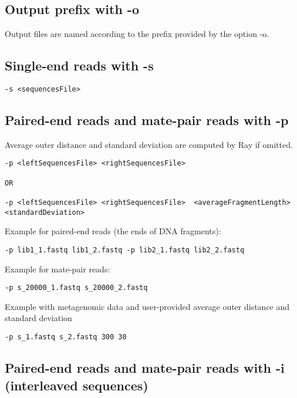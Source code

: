 \documentclass{article}
\begin{document}
\subsection{Output prefix with -o}

Output files are named according to the prefix provided by the option -o.

\subsection{Single-end reads with -s}

\begin{verbatim}
-s <sequencesFile>
\end{verbatim}

\subsection{Paired-end reads and mate-pair reads with -p}

Average outer distance and standard deviation are computed by Ray if omitted.

\begin{verbatim}
-p <leftSequencesFile> <rightSequencesFile>  

OR

-p <leftSequencesFile> <rightSequencesFile>  <averageFragmentLength> <standardDeviation> 
\end{verbatim}

Example for paired-end reads (the ends of DNA fragments):

\begin{verbatim}
-p lib1_1.fastq lib1_2.fastq -p lib2_1.fastq lib2_2.fastq
\end{verbatim}

Example for mate-pair reads:

\begin{verbatim}
-p s_20000_1.fastq s_20000_2.fastq
\end{verbatim}

Example with metagenomic data and user-provided average outer distance and standard deviation

\begin{verbatim}
-p s_1.fastq s_2.fastq 300 30
\end{verbatim}

\subsection{Paired-end reads and mate-pair reads with -i (interleaved sequences)}
\end{document}
